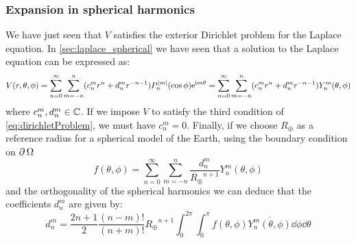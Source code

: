\documentclass[../main.tex]{subfiles}
\begin{document}
\subsubsection{Expansion in spherical harmonics}
We have just seen that $V$ satisfies the exterior Dirichlet problem for the Laplace equation. In \cref{sec:laplace_spherical} we have seen that a solution to the Laplace equation can be expressed as:
\begin{equation}
  V(r,\theta,\phi) = \sum_{n=0}^\infty \sum_{m=-n}^n (c_{n}^m r^{n} +d_n^mr^{-n-1})P_n^\abs{m}(\cos\phi) \mathrm{e}^{\mathrm{i} m\theta} = \sum_{n=0}^\infty \sum_{m=-n}^n (c_{n}^m r^{n} +d_n^mr^{-n-1})Y_n^m(\theta,\phi)
\end{equation}
where $c_{n}^m,d_n^m\in\mathbb{C}$. If we impose $V$ to satisfy the third condition of \cref{eq:dirichletProblem}, we must have $c_{n}^m=0$. Finally, if we choose $R_\oplus$ as a reference radius for a spherical model of the Earth, using the boundary condition on $\operatorname{\partial}{\Omega}$
\begin{equation}
  f(\theta,\phi) = \sum_{n=0}^\infty \sum_{m=-n}^n \frac{d_n^m}{{R_\oplus}^{n+1}}Y_n^m(\theta,\phi)
\end{equation}
and the orthogonality of the spherical harmonics we can deduce that the coefficients $d_n^m$ are given by:
\begin{equation}
  d_n^m=\frac{2n+1}{2}\frac{(n-m)!}{(n+m)!}{R_\oplus}^{n+1}\int_0^{2\pi}\int_0^\pi f(\theta,\phi) \overline{Y_{n}^{m}(\theta,\phi)}\dd{\phi}\dd{\theta}
\end{equation}
\end{document}
